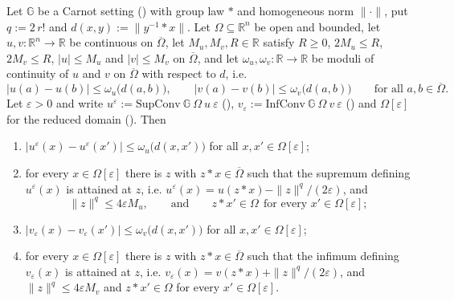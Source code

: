 \begin{lemma}
Let $\mathbb G$ be a Carnot setting () with group law $*$ and
homogeneous norm $\|\cdot\|$, put $q:=2\,r!$ and $d(x,y):=\|y^{-1}*x\|$. Let
$\Omega\subseteq\mathbb R^{n}$ be open and bounded, let $u,v:\mathbb R^{n}\to\mathbb R$ be
continuous on $\overline\Omega$, let $M_u,M_v,R\in\mathbb R$ satisfy $R\ge0$,
$2M_u\le R$, $2M_v\le R$, $|u|\le M_u$ and $|v|\le M_v$ on $\overline\Omega$, and let
$\omega_u,\omega_v:\mathbb R\to\mathbb R$ be moduli of continuity of $u$ and $v$ on
$\overline\Omega$ with respect to $d$, i.e.
\[
 |u(a)-u(b)|\le\omega_u\big(d(a,b)\big),\qquad |v(a)-v(b)|\le\omega_v\big(d(a,b)\big)
 \qquad\text{for all }a,b\in\overline\Omega .
\]
Let $\varepsilon>0$ and write $u^{\varepsilon}:=\mathrm{SupConv}\ \mathbb G\ \Omega\ u\
\varepsilon$ (), $v_{\varepsilon}:=\mathrm{InfConv}\ \mathbb G\ \Omega\ v\
\varepsilon$ () and $\Omega[\varepsilon]$ for the reduced domain
(\noderef{ReducedDomain}). Then
\begin{enumerate}
\item $|u^{\varepsilon}(x)-u^{\varepsilon}(x')|\le\omega_u\big(d(x,x')\big)$ for all
  $x,x'\in\Omega[\varepsilon]$;
\item for every $x\in\Omega[\varepsilon]$ there is $z$ with $z*x\in\overline\Omega$ such
  that the supremum defining $u^{\varepsilon}(x)$ is attained at $z$, i.e.
  $u^{\varepsilon}(x)=u(z*x)-\|z\|^{q}/(2\varepsilon)$, and
  \[
   \|z\|^{q}\le4\varepsilon M_u,\qquad\text{and}\qquad z*x'\in\Omega
   \ \ \text{for every }x'\in\Omega[\varepsilon];
  \]
\item $|v_{\varepsilon}(x)-v_{\varepsilon}(x')|\le\omega_v\big(d(x,x')\big)$ for all
  $x,x'\in\Omega[\varepsilon]$;
\item for every $x\in\Omega[\varepsilon]$ there is $z$ with $z*x\in\overline\Omega$ such
  that the infimum defining $v_{\varepsilon}(x)$ is attained at $z$, i.e.
  $v_{\varepsilon}(x)=v(z*x)+\|z\|^{q}/(2\varepsilon)$, and $\|z\|^{q}\le4\varepsilon M_v$
  and $z*x'\in\Omega$ for every $x'\in\Omega[\varepsilon]$.
\end{enumerate}
\end{lemma}
